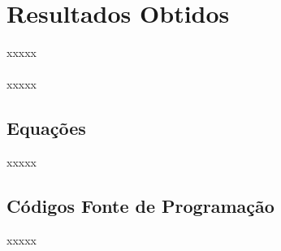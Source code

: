\chapter{Resultados Obtidos}
\label{Cap:Resultados}
\newcommand{\EscalaAlgumaCoisa}{0.6}


xxxxx
\\\\
xxxxx 






\section{Equações}

xxxxx

\section{Códigos Fonte de Programação}

xxxxx

